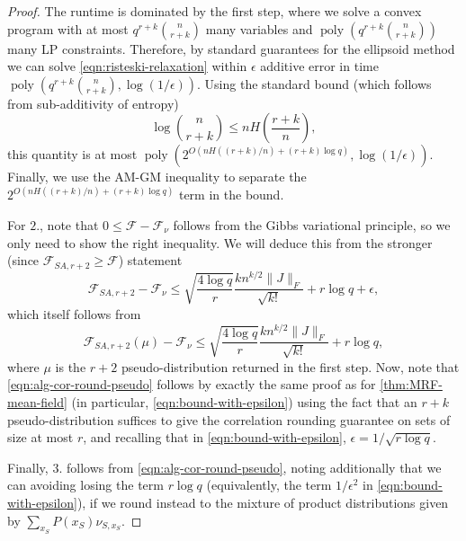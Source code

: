 \documentclass[11pt, oneside, english]{article}
\newcommand{\F}{\mathcal{F}}
\DeclareMathOperator{\poly}{poly}
\theoremstyle{definition}
\theoremstyle{plain}
\begin{document}
\begin{proof}
The runtime is dominated by the first step, where we solve a convex program with at most $q^{r+k} {n \choose r+k}$ many variables and $\poly\left(q^{r+k}\binom{n}{r+k}\right)$ many LP constraints. Therefore, by standard guarantees for the ellipsoid method \cite{gls} we can solve \cref{eqn:risteski-relaxation} within $\epsilon$ additive error in time $\poly\left(q^{r+k}\binom{n}{r+k}, \log(1/\epsilon)\right)$. Using the standard bound (which follows from sub-additivity of entropy)
\[ \log {n \choose r+k} \le n H\left(\frac{r+k}{n}\right), \]
this quantity is at most $\poly\left(2^{O(nH((r+k)/n)+(r+k)\log{q})},\log(1/\epsilon)\right)$. 
Finally, we use the AM-GM inequality to separate the $2^{O(n H((r+k)/n) + (r+k) \log q)}$ term in the bound.

For $2.$, note that $0\leq \F - \F_{\nu}$ follows from the Gibbs variational principle, so we only need to show the right inequality. We will deduce this from the stronger (since $\F_{SA,r+2} \geq \F$) statement
\begin{equation}
\F_{SA,r+2} - \F_{\nu} \leq \sqrt{\frac{4\log{q}}{r}} \frac{k n^{k/2} \|J\|_F}{\sqrt{k!}} + r \log q + \epsilon,
\end{equation}
which itself follows from
\begin{equation}
\label{eqn:alg-cor-round-pseudo}
\F_{SA,r+2}(\mu) - \F_{\nu} \leq \sqrt{\frac{4\log{q}}{r}} \frac{k n^{k/2} \|J\|_F}{\sqrt{k!}} + r \log q,
\end{equation}
where $\mu$ is the $r+2$ pseudo-distribution returned in the first step. Now, note that \cref{eqn:alg-cor-round-pseudo} follows by exactly the same proof as for \cref{thm:MRF-mean-field} (in particular, \cref{eqn:bound-with-epsilon}) using the fact that an $r+k$ pseudo-distribution suffices to give the correlation rounding guarantee on sets of size at most $r$, and recalling that in \cref{eqn:bound-with-epsilon}, $\epsilon = 1/\sqrt{r\log q}$. 

Finally, $3.$ follows from \cref{eqn:alg-cor-round-pseudo}, noting additionally that we can avoiding losing the term $r \log q$ (equivalently, the term $1/\epsilon^{2}$ in \cref{eqn:bound-with-epsilon}), if we round instead to the mixture of product distributions given by $\sum_{x_S} P(x_S) \nu_{S,x_S}$.
\end{proof}
\end{document}
